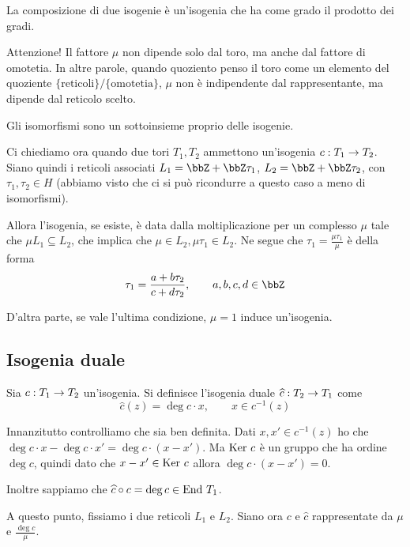 	\begin{osservazione}
		La composizione di due isogenie è un'isogenia che ha come grado il prodotto dei gradi.
	\end{osservazione}
	
	Attenzione! Il fattore $\mu$ non dipende solo dal toro, ma anche dal fattore di omotetia. In altre parole, quando quoziento penso il toro come un elemento del quoziente $\{ \mbox{reticoli} \} / \{ \mbox{omotetia} \}$, $\mu$ non è indipendente dal rappresentante, ma dipende dal reticolo scelto.
	
	\begin{osservazione} 
		Gli isomorfismi sono un sottoinsieme proprio delle isogenie.
	\end{osservazione}

	Ci chiediamo ora quando due tori $T_1, T_2$ ammettono un'isogenia $c: T_1 \rightarrow T_2$. Siano quindi i reticoli associati $L_1=\bbZ + \bbZ \tau_1$, $L_2=\bbZ + \bbZ \tau_2$, con $\tau_1,\tau_2 \in H$ (abbiamo visto che ci si può ricondurre a questo caso a meno di isomorfismi).
	
	Allora l'isogenia, se esiste, è data dalla moltiplicazione per un complesso $\mu$ tale che $\mu L_1 \subseteq L_2$, che implica che $\mu \in L_2, \mu\tau_1 \in L_2$. Ne segue che $\tau_1 = \frac{\mu\tau_1}{\mu}$ è della forma 
	\[
		\tau_1 = \frac{a + b\tau_2}{c+d\tau_2}, \qquad a,b,c,d \in \bbZ
	\]
	
	D'altra parte, se vale l'ultima condizione, $\mu=1$ induce un'isogenia.

	\subsection{Isogenia duale}
	
	Sia $c: T_1 \rightarrow T_2$ un'isogenia. Si definisce l'isogenia duale $\widehat c: T_2 \rightarrow T_1$ come 
	\[
		\hat c(z) = \deg c\cdot x, \qquad x \in c^{-1}(z)
	\]
	
	Innanzitutto controlliamo che sia ben definita. Dati $x, x' \in c^{-1}(z)$ ho che $\deg c \cdot x - \deg c \cdot x' = \deg c \cdot (x-x')$. Ma $\mbox{Ker } c$ è un gruppo che ha ordine $\deg c$, quindi dato che $x-x' \in \mbox{Ker } c$ allora $\deg c \cdot (x-x') = 0$.
	
	Inoltre sappiamo che $\widehat c \circ c = \deg c \in \mbox{End } T_1$.
	
	A questo punto, fissiamo i due reticoli $L_1$ e $L_2$. Siano ora $c$ e $\hat c$ rappresentate da $\mu$ e $\frac{\deg c}\mu$.
	

